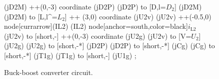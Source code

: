 \begin{figure}[htb]
\begin{center}
\begin{circuitikz}
                    (jD2M) ++(0,-3) coordinate (jD2P)
                    (jD2P) to  [D,l=$D_2$] (jD2M)                                      
                    (jD2M) to  [L,l^=$L_2$] ++ (3,0) coordinate (jU2v)
                    (jU2v) ++(-0.5,0) node[currarrow](IL2){}
                    (IL2)  node[anchor=south,color=black]{$i_\mathrm{L2}$}
                    (jU2v) to [short,-] ++(0,-3) coordinate (jU2g)
                    (jU2v) to [V=$U_2$] (jU2g)
                    (jU2g) to [short,-*] (jD2P)
                    (jD2P) to [short,-*] (jCg)                    
                    (jCg) to [short,-*] (jT1g)                    
                    (jT1g) to [short,-] (jU1g)                    
           ;
        \end{circuitikz}
    \end{center}
    \caption{Buck-boost converter circuit.}
    \label{fig:ex03_boost_buck_converter}
\end{figure}
